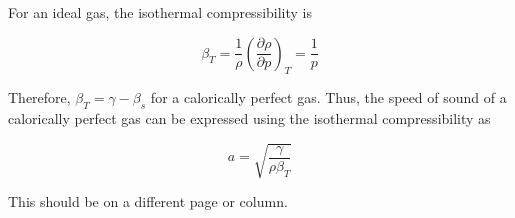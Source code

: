 \documentclass[twocolumn]{article}
\begin{document}
For an ideal gas, the isothermal compressibility is 

\begin{equation}
    \beta_T = \frac{1}{\rho} \left(\frac{\partial \rho}{\partial p} \right)_T = \frac{1}{p}
\end{equation}

Therefore, $\beta_T = \gamma- \beta_s$ for a calorically perfect gas. Thus, the speed of sound of a calorically perfect gas can be expressed using the isothermal compressibility as 

\begin{equation}
    \boxed{a = \sqrt{\frac{\gamma}{\rho \beta_T}}}
    \end{equation}

\pagebreak

\pagebreak
{}
This should be on a different page or column.
\end{document}
